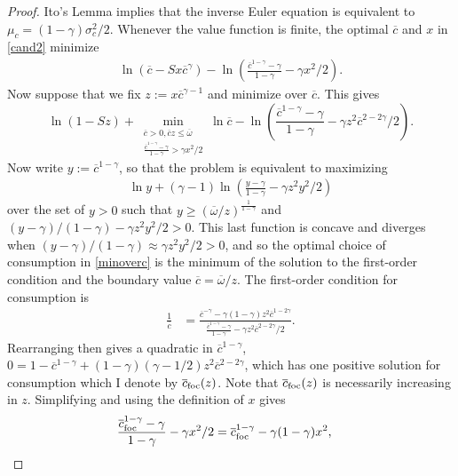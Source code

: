 \documentclass[11pt]{article}
\theoremstyle{plain}
\theoremstyle{definition} %
\begin{document}
\begin{proof}
Ito's Lemma implies that the inverse Euler equation is equivalent to $\mu_c = {\left(1 - \gamma\right)}\sigma_c^2/2$. Whenever the value function is finite, the optimal $\overline{c}$ and $x$ in \eqref{cand2} minimize
\begin{align*}
\ln (\overline{c} - Sx\overline{c}^{\gamma}) - \ln {\left(\frac{\overline{c}^{1-\gamma} - \gamma}{1-\gamma} - \gamma x^2/2 \right)}.
\end{align*} %
Now suppose that we fix $z := x\overline{c}^{\gamma-1}$ and minimize over $\overline{c}$. This gives
\begin{equation}
\ln (1 - Sz) + \min_{\substack{\overline{c} > 0, \overline{c}z \leq \overline{\omega} \\ \frac{\overline{c}^{1-\gamma} - \gamma}{1-\gamma} > \gamma x^2/2}} \ln \overline{c} - \ln {\left(\frac{\overline{c}^{1-\gamma} - \gamma}{1-\gamma} - \gamma z^2\overline{c}^{2-2\gamma}/2 \right)}.
\label{minoverc}
\end{equation}
Now write $y := \overline{c}^{1-\gamma}$, so that the problem is equivalent to maximizing
\begin{align*}
\ln y + (\gamma - 1) \ln {\left(\frac{y - \gamma}{1 - \gamma} - \gamma z^2y^2/2 \right)}
\end{align*}
over the set of $y > 0$ such that $y \geq (\overline{\omega}/z)^{\frac{1}{1-\gamma}}$ and $(y - \gamma)/(1 - \gamma) - \gamma z^2y^2/2 > 0$. This last function is concave and diverges when $(y - \gamma)/(1 - \gamma) \approx \gamma z^2y^2/2 > 0$, and so the optimal choice of consumption in \eqref{minoverc} is the minimum of the solution to the first-order condition and the boundary value $\overline{c} = \overline{\omega}/z$. The first-order condition for consumption is
\begin{align*}
\frac{1}{\overline{c}} & = \frac{\overline{c}^{-\gamma} - \gamma(1 - \gamma) z^2\overline{c}^{1 - 2\gamma}}{\frac{\overline{c}^{1-\gamma} - \gamma}{1 - \gamma} - \gamma z^2\overline{c}^{2 - 2\gamma}/2}.
\end{align*}
Rearranging then gives a quadratic in $\overline{c}^{1-\gamma}$, $0 = 1 - \overline{c}^{1-\gamma} + (1-\gamma)(\gamma-1/2) z^2\overline{c}^{2-2\gamma}$, which has one positive solution for consumption which I denote by $\overline{c}_{\textnormal{foc}}(z)$. Note that $\overline{c}_{\textnormal{foc}}(z)$ is necessarily increasing in $z$. Simplifying and using the definition of $x$ gives
\begin{align*}
\frac{\overline{c}_{\textnormal{foc}}^{1 - \gamma} - \gamma}{1 - \gamma} - \gamma x^2/2 & = \overline{c}_{\textnormal{foc}}^{1 - \gamma} - \gamma (1 - \gamma) x^2,

\end{align*}
\end{proof}
\end{document}
